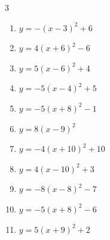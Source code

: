 \begin{multicols}{3}
\begin{enumerate}
  \item $\displaystyle y=-\left( x-3\right)^{2}+6$

        \phantom{$\displaystyle 頂点\left( 3 , 6 \right)$}

  \item $\displaystyle y=4\left( x+6\right)^{2}-6$

        \phantom{$\displaystyle 頂点\left( -6 , -6 \right)$}

  \item $\displaystyle y=5\left( x-6\right)^{2}+4$

        \phantom{$\displaystyle 頂点\left( 6 , 4 \right)$}

  \item $\displaystyle y=-5\left( x-4\right)^{2}+5$

        \phantom{$\displaystyle 頂点\left( 4 , 5 \right)$}

\columnbreak %

  \item $\displaystyle y=-5\left( x+8\right)^{2}-1$

        \phantom{$\displaystyle 頂点\left( -8 , -1 \right)$}

  \item $\displaystyle y=8\left( x-9\right)^{2}$

        \phantom{$\displaystyle 頂点\left( 9 , 0 \right)$}

  \item $\displaystyle y=-4\left( x+10\right)^{2}+10$

        \phantom{$\displaystyle 頂点\left( -10 , 10 \right)$}

  \item $\displaystyle y=4\left( x-10\right)^{2}+3$

        \phantom{$\displaystyle 頂点\left( 10 , 3 \right)$}

  \item $\displaystyle y=-8\left( x-8\right)^{2}-7$

        \phantom{$\displaystyle 頂点\left( 8 , -7 \right)$}

  \item $\displaystyle y=-5\left( x+8\right)^{2}-6$

        \phantom{$\displaystyle 頂点\left( -8 , -6 \right)$}

  \item $\displaystyle y=5\left( x+9\right)^{2}+2$

        \phantom{$\displaystyle 頂点\left( -9 , 2 \right)$}


\end{enumerate}
\end{multicols}
